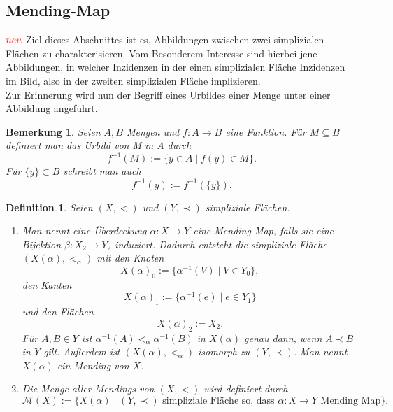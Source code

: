 \documentclass[12pt,titlepage]{article}
\newtheorem{definition}{Definition}[section]
\newtheorem{bemerkung}{Bemerkung}[section]
\begin{document}
 \subsection{Mending-Map}
 $\textcolor{red}{neu}$
 Ziel dieses Abschnittes ist es, Abbildungen zwischen zwei simplizialen Flächen zu charakterisieren. Vom Besonderem Interesse sind hierbei jene Abbildungen, in welcher Inzidenzen in der einen simplizialen Fläche Inzidenzen im Bild, also in der zweiten simplizialen Fläche implizieren.\\
 Zur Erinnerung wird nun der Begriff eines Urbildes einer Menge unter einer Abbildung angeführt.
\begin{bemerkung}
Seien $A,B$ Mengen und $f:A \to B$ eine Funktion. Für $M \subseteq B$ definiert man das \emph{Urbild von M in A} durch 
\[
f^{-1}(M):=\{y\in A \mid f(y)\in M\}.
\]
Für $\{y\} \subset B$ schreibt man auch
\[
f^{-1}(y):=f^{-1}(\{y\}).
\]
\end{bemerkung}
  \begin{definition}
  Seien $(X,<)$ und $(Y,\prec)$ simpliziale Flächen.
  \begin{enumerate}
  \item Man nennt eine Überdeckung $\alpha:X \to Y$ eine \emph{Mending Map}, falls sie eine Bijektion $\beta : X_{2}\to Y_{2}$ induziert. Dadurch entsteht die simpliziale Fläche $(X(\alpha),<_{\alpha})$ mit den Knoten
  \[
X(\alpha)_0:=\{\alpha^{-1}(V)\mid V \in Y_0 \},
  \] 
  den Kanten 
  \[
X(\alpha)_1:=\{\alpha^{-1}(e)\mid e \in Y_1 \} 
  \]
 und den Flächen 
  \[
X(\alpha)_2:=X_2  .
  \]
  Für $A,B \in Y$ ist $\alpha^{-1}(A)<_{\alpha}\alpha^{-1}(B)$ in $X(\alpha)$ genau dann, wenn $A \prec B  $ in $Y$ gilt. Außerdem ist $(X(\alpha),<_{\alpha})$ isomorph zu $(Y,\prec)$. Man nennt $X(\alpha)$ ein \emph{Mending von $X$}.

  \item Die Menge aller Mendings von $(X,<)$ wird definiert durch 
\[
\mathcal{M}(X):=\{X(\alpha )\mid
 \text{$(Y,\prec )$ simpliziale Fläche so, dass  $\alpha : X \to Y$ Mending Map}
 \}  .
\]

  \end{enumerate}
  \end{definition}
  
\end{document}
